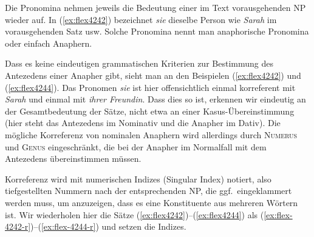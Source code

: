 \begin{exe}
\end{exe}


Die Pronomina nehmen jeweils die Bedeutung einer im Text vorausgehenden NP wieder auf.
In (\ref{ex:flex4242}) bezeichnet \textit{sie} dieselbe Person wie \textit{Sarah} im vorausgehenden Satz usw.
Solche Pronomina nennt man anaphorische Pronomina oder einfach Anaphern.


Dass es keine eindeutigen grammatischen Kriterien zur Bestimmung des Antezedens einer Anapher gibt, sieht man an den Beispielen (\ref{ex:flex4242}) und (\ref{ex:flex4244}).
Das Pronomen \textit{sie} ist hier offensichtlich einmal korreferent mit \textit{Sarah} und einmal mit \textit{ihrer Freundin}.
Dass dies so ist, erkennen wir eindeutig an der Gesamtbedeutung der Sätze, nicht etwa an einer Kasus-Übereinstimmung (hier steht das Antezedens im Nominativ und die Anapher im Dativ).
Die mögliche Korreferenz von nominalen Anaphern wird allerdings durch \textsc{Numerus} und \textsc{Genus} eingeschränkt, die bei der Anapher im Normalfall mit dem Antezedens übereinstimmen müssen.

Korreferenz wird mit numerischen Indizes (Singular Index) notiert, also tiefgestellten Nummern nach der entsprechenden NP, die ggf.\ eingeklammert werden muss, um anzuzeigen, dass es eine Konstituente aus mehreren Wörtern ist.
Wir wiederholen hier die Sätze (\ref{ex:flex4242})--(\ref{ex:flex4244}) als (\ref{ex:flex-4242-r})--(\ref{ex:flex-4244-r}) und setzen die Indizes.

\begin{exe}
\end{exe}

